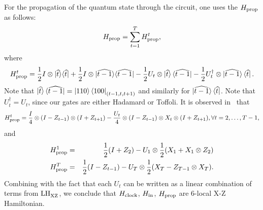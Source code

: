 For the propagation of the quantum state through the circuit, one uses the $H_{\mathrm{prop}}$ as follows:
\begin{equation*} \label{eqn:Hprop}
    H_{\mathrm{prop}}=\sum_{t=1}^T H_{\mathrm{prop}}^t,
\end{equation*}
where
\begin{equation}
    H_{\mathrm{prop}}^t=\frac{1}{2}I\otimes|\widehat{t}\rangle\langle \widehat{t}|
    +\frac{1}{2}I\otimes|\widehat{t-1}\rangle\langle \widehat{t-1}|
    -\frac{1}{2} U_t\otimes\ket{\widehat{t}}\bra{\widehat{t-1}}
    -\frac{1}{2}U_t^\dagger\otimes\ket{\widehat{t-1}}\bra{\widehat{t}}.
\end{equation}
Note that $\ket{\widehat{t}}\bra{\widehat{t-1}}=\ket{110}\bra{100}_{(t-1,t,t+1)}$ and similarly for $\ket{\widehat{t-1}}\bra{\widehat{t}}$.
Note that $U_t^\dagger=U_t$, since our gates are either Hadamard or Toffoli. It is observed in~\cite{PhysRevA.78.012352} that
\begin{equation}
   H_{\mathrm{prop}}^t=\frac{I}{4}\otimes(I-Z_{t-1})\otimes (I+Z_{t+1})-\frac{U_t}{4}\otimes(I-Z_{t-1})\otimes X_t\otimes (I+Z_{t+1}), \forall t=2, \ldots, T-1,
\end{equation}
and
\begin{eqnarray}
  H_{\mathrm{prop}}^1 &= & \frac{1}{2}(I+Z_2)-U_1\otimes\frac{1}{2}(X_1+X_1\otimes Z_2) \\
  H_{\mathrm{prop}}^T &= & \frac{1}{2}(I-Z_{t-1})-U_T\otimes\frac{1}{2}(X_T-Z_{T-1}\otimes X_T).
\end{eqnarray}
%     
Combining with the fact that each $U_t$ can be written as a linear combination of terms from $\mathrm{LH}_{\mathrm{XZ}}^{}$, we conclude that $H_{\mathrm{clock}}$, $H_{\mathrm{in}}$, $H_{\mathrm{prop}}$ are 6-local X-Z Hamiltonian.


